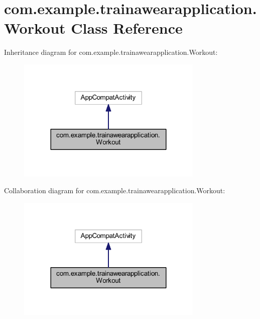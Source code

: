\hypertarget{classcom_1_1example_1_1trainawearapplication_1_1_workout}{}\section{com.\+example.\+trainawearapplication.\+Workout Class Reference}
\label{classcom_1_1example_1_1trainawearapplication_1_1_workout}


Inheritance diagram for com.\+example.\+trainawearapplication.\+Workout\+:
\nopagebreak
\begin{figure}[H]
\begin{center}
\leavevmode
\includegraphics[width=252pt]{classcom_1_1example_1_1trainawearapplication_1_1_workout__inherit__graph}
\end{center}
\end{figure}


Collaboration diagram for com.\+example.\+trainawearapplication.\+Workout\+:
\nopagebreak
\begin{figure}[H]
\begin{center}
\leavevmode
\includegraphics[width=252pt]{classcom_1_1example_1_1trainawearapplication_1_1_workout__coll__graph}
\end{center}
\end{figure}
